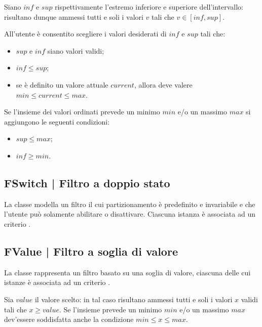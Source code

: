 \documentclass[10pt,a4paper,headinclude,footinclude,hidelinks]{scrreprt} %
\begin{document}
	Siano $inf$ e $sup$ rispettivamente l'estremo inferiore e superiore dell'intervallo: risultano dunque ammessi tutti e soli i valori $v$ tali che $v \in \left[inf,sup\right]$.

	All'utente è consentito scegliere i valori desiderati di $inf$ e $sup$ tali che:
	\begin{itemize}
	\item $sup$ e $inf$ siano valori validi;
	\item $inf \leq sup$;
	\item se è definito un valore attuale $current$, allora deve valere $min \leq current \leq max$.
	\end{itemize}

	Se l'insieme dei valori ordinati prevede un minimo $min$ e/o un massimo $max$ si aggiungono le seguenti condizioni:
	\begin{itemize}
	\item $sup \leq max$;
	\item $inf \geq min$.
	\end{itemize}

	\subsection[FSwitch]{FSwitch | Filtro a doppio stato}
	\label{sec:stage:design:model.filter:switch-filter}
	La classe \textit{} modella un filtro il cui partizionamento è predefinito e invariabile e che l'utente può solamente abilitare o disattivare. Ciascuna istanza è associata ad un criterio \textit{}.

	\subsection[FValue]{FValue | Filtro a soglia di valore}
	\label{sec:stage:design:model.filter:value-filter}
	La classe \textit{} rappresenta un filtro basato su una soglia di valore, ciascuna delle cui istanze è associata ad un criterio \textit{}.

	Sia $value$ il valore scelto: in tal caso risultano ammessi tutti e soli i valori $x$ validi tali che $x \geq value$. Se l'insieme prevede un minimo $min$ e/o un massimo $max$ dev'essere soddisfatta anche la condizione $min \leq x \leq max$.

\end{document}
